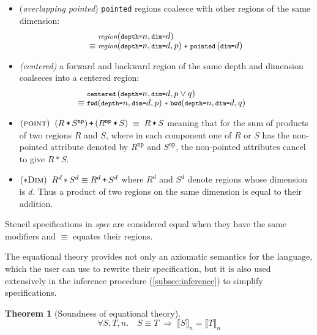 \documentclass[10pt,preprint]{sigplanconf}
\newcounter{block}
\theoremstyle{definition}
\newtheorem{theorem}[block]{Theorem}
\newcommand{\interp}[1]{\llbracket{#1}\rrbracket}
\newcommand{\term}[1]{\texttt{#1}}
\newcommand{\stenCen}[3]{\term{centered} \, (\term{depth=}#1,
  \term{dim=}#2{#3})}
\newcommand{\stenReflS}[1]{\term{pointed} \, (\term{dim=}#1)}
\newcommand{\irreflS}{\texttt{np}}
\newcommand{\stenFwdSR}[3]{\term{fwd} (\term{depth=}#1,
  \term{dim=}#2, #3)}
\newcommand{\stenBwdSR}[3]{\term{bwd} (\term{depth=}#1,
  \term{dim=}#2, #3)}
\begin{document}
\begin{itemize}
\item (\textit{overlapping pointed}) \term{pointed} regions coalesce with other regions of the
same dimension:
%
\begin{align*}
& \stenG{n}{d}{region} \\[-0.4em]
\equiv \; & \stenGR{n}{d}{p}{region} \; \texttt{+} \;
                          \stenReflS{d}
\end{align*}
%
\item \textit{(centered)} a forward and backward region of the same
  depth and dimension coalseces into a centered region:
\begin{align*}
\hspace{-1em} & {\small{\stenCen{n}{d}{, p \vee q}}} \\[-0.4em]
\hspace{-1em} \equiv \; & {\small{\stenFwdSR{n}{d}{p} \; \texttt{+} \;
                          \stenBwdSR{n}{d}{q}}}
\end{align*}
\item $(\textsc{point}) \;\; (R \, \term{*} \, S^\irreflS) \, \term{+} \,
                         (R^\irreflS \, \term{*} \, S) \; \equiv \; R
                         \, \term{*} \, S$
meaning that for the sum of products of two regions $R$ and $S$,
where in each component one of $R$ or $S$ has the non-pointed
attribute denoted by $R^{\term{np}}$ and $S^{\term{op}}$,
the non-pointed attributes cancel to give $R \, \term{*} \, S$.
%
\item $(\textsc{$\ast$Dim}) \;\; R^d \, \term{$\ast$} \, S^d \equiv R^d
                             \, \term{+} \, S^d$
%
where $R^d$ and $S^d$ denote regions whose dimension is $d$.
Thus a product of two regions on
the same dimension is equal to their addition.
\end{itemize}
%
Stencil specifications in \textit{spec} are considered
equal when they have the same modifiers and $\equiv$ equates
their regions.

The equational theory provides not only an axiomatic semantics
for the language, which the user can use to rewrite their
specification, but it is also used extensively in the inference
procedure (\cref{subsec:inference}) to simplify specifications.

\begin{theorem}[Soundness of equational theory]
\begin{equation*}
\forall S, T, n . \quad
S \equiv T \; \Rightarrow \;
\interp{S}_n = \interp{T}_n
\end{equation*}
\end{theorem}
\end{document}
